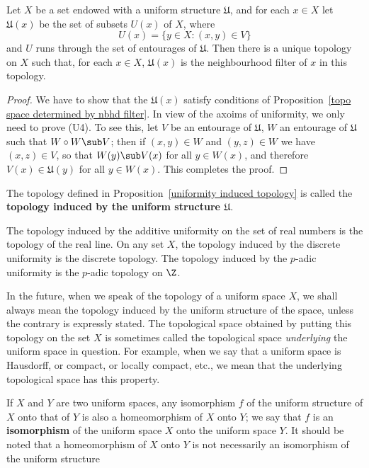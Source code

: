 \begin{proposition}\label{uniformity induced topology}
Let $X$ be a set endowed with a uniform structure $\mathfrak{U}$, and for each $x\in X$ let $\mathfrak{U}(x)$ be the set of subsets $U(x)$ of $X$, where
\[U(x)=\{y\in X:(x,y)\in V\}\]
and $U$ runs through the set of entourages of $\mathfrak{U}$. Then there is a unique topology on $X$ such that, for each $x\in X$, $\mathfrak{U}(x)$ is the neighbourhood filter of $x$ in this topology.
\end{proposition}
\begin{proof}
We have to show that the $\mathfrak{U}(x)$ satisfy conditions of Proposition~\ref{topo space determined by nbhd filter}. In view of the axoims of uniformity, we only need to prove (U4). To see this, let $V$ be an entourage of $\mathfrak{U}$, $W$ an entourage of $\mathfrak{U}$ such that $W\circ W\sub V$; then if $(x,y)\in W$ and $(y,z)\in W$ we have $(x,z)\in V$, so that $W(y)\sub V(x)$ for all $y\in W(x)$, and therefore $V(x)\in\mathfrak{U}(y)$ for all $y\in W(x)$. This completes the proof.
\end{proof}
The topology defined in Proposition~\ref{uniformity induced topology} is called the \textbf{topology induced by the uniform structure $\mathfrak{U}$}.
\begin{example}
The topology induced by the additive uniformity on the set of real numbers is the topology of the real line. On any set $X$, the topology induced by the discrete uniformity is the discrete topology. The topology induced by the $p$-adic uniformity is the $p$-adic topology on $\Z$.
\end{example}
In the future, when we speak of the topology of a uniform space $X$, we shall always mean the topology induced by the uniform structure of the space, unless the contrary is expressly stated. The topological space obtained by putting this topology on the set $X$ is sometimes called the topological space \textit{underlying} the uniform space in question. For example, when we say that a uniform space is Hausdorff, or compact, or locally compact, etc., we mean that the underlying topological space has this property.\par
If $X$ and $Y$ are two uniform spaces, any isomorphism $f$ of the uniform structure of $X$ onto that of $Y$ is also a homeomorphism of $X$ onto $Y$; we say that $f$ is an \textbf{isomorphism} of the uniform space $X$ onto the uniform space $Y$. It should be noted that a homeomorphism of $X$ onto $Y$ is not necessarily an isomorphism of the uniform structure
